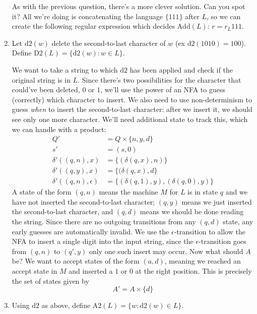 \documentclass[fleqn]{article}
\begin{document}
\begin{enumerate}
\begin{answer}
        As with the previous question, there's a more clever solution. Can you spot it? All we're doing is concatenating the language $\{111\}$ after $L$, so we can create the following regular expression which decides $\text{Add}(L)$: $r = r_L 111$.
    \end{answer}
    \item Let $\text{d2}(w)$ delete the second-to-last character of $w$ (ex $\text{d2}(1010) = 100$). Define $\text{D2}(L) = \{\text{d2}(w) : w \in L\}$.
    \begin{answer}
        We want to take a string to which $\text{d2}$ has been applied and check if the original string is in $L$. Since there's two possibilities for the character that could've been deleted, $0$ or $1$, we'll use the power of an NFA to guess (correctly) which character to insert. We also need to use non-determinism to guess \textit{when} to insert the second-to-last character: after we insert it, we should see only one more character. We'll need additional state to track this, which we can handle with a product:
        \[
            \begin{aligned}
                Q' &= Q \times \{n,y,d\} \\
                s' &= (s, 0) \\
                \delta'((q, n), x) &= \{(\delta(q,x), n)\} \\
                \delta'((q, y), x) &= \{(\delta(q,x), d\} \\
                \delta'((q, n), \epsilon) &= \{(\delta(q, 1), y), (\delta(q,0), y)\}
            \end{aligned}
        \]
        A state of the form $(q,n)$ means the machine $M$ for $L$ is in state $q$ and we have not inserted the second-to-last character; $(q,y)$ means we just inserted the second-to-last character, and $(q,d)$ means we should be done reading the string. Since there are no outgoing transitions from any $(q,d)$ state, any early guesses are automatically invalid. We use the $\epsilon$-transition to allow the NFA to insert a single digit into the input string, since the $\epsilon$-transition goes from $(q,n)$ to $(q',y)$ only one such insert may occur. Now what should $A$ be? We want to accept states of the form $(a,d)$, meaning we reached an accept state in $M$ and inserted a $1$ or $0$ at the right position. This is precisely the set of states given by
        \[
            A' = A \times \{d\}
        \]
    \end{answer}
    \item Using $\text{d2}$ as above, define $\text{A2}(L) = \{w : \text{d2}(w) \in L\}$.

\end{enumerate}
\end{document}
